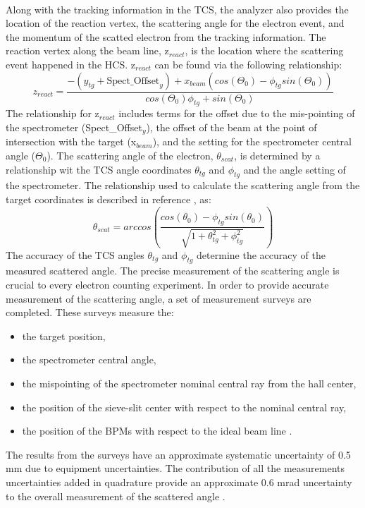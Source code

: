 \paragraph{}Along with the tracking information in the TCS, the analyzer also provides the location of the reaction vertex, the scattering angle for the electron event, and the momentum of the scatted electron from the tracking information. The reaction vertex along the beam line, z$_{react}$, is the location where the scattering event happened in the HCS. z$_{react}$ can be found via the following relationship:
\begin{equation}
z_{react} = \frac{-(y_{tg} + \text{Spect\_Offset}_y) + x_{beam}(cos(\Theta_0) - \phi_{tg}sin(\Theta_0))} {cos(\Theta_0)\phi_{tg} + sin(\Theta_0)}
\end{equation}
The relationship for z$_{react}$ includes terms for the offset due to the mis-pointing of the spectrometer (Spect\_Offset$_y$), the offset of the beam at the point of intersection with the target (x$_{beam}$), and the setting for the spectrometer central angle ($\Theta_0$). The scattering angle of the electron, $\theta_{scat}$, is determined by a relationship wit the TCS angle coordinates $\theta_{tg}$ and $\phi_{tg}$ and the angle setting of the spectrometer. The relationship used to calculate the scattering angle from the target coordinates is described in reference \cite{HallA}, as:
\begin{equation}
\theta_{scat} = arccos \left( \frac{cos(\theta_{0})- \phi_{tg}sin(\theta_{0})} {\sqrt{1 + \theta_{tg}^2 + \phi_{tg}^2}} \right) \label{scatangle}
\end{equation}
The accuracy of the TCS angles $\theta_{tg}$ and $\phi_{tg}$ determine the accuracy of the measured scattered angle. The precise measurement of the scattering angle is crucial to every electron counting experiment. In order to provide accurate measurement of the scattering angle, a set of measurement surveys are completed. These surveys measure the:
\begin{itemize}
	\item the target position,
	\item the spectrometer central angle,
	\item the mispointing of the spectrometer nominal central ray from the hall center,
	\item the position of the sieve-slit center with respect to the nominal central ray,
	\item the position of the BPMs with respect to the ideal beam line \cite{HallA}.
\end{itemize} 
The results from the surveys have an approximate systematic uncertainty of 0.5 mm due to equipment uncertainties. The contribution of all the measurements uncertainties added in quadrature provide an approximate 0.6 mrad uncertainty to the overall measurement of the scattered angle \cite{HallA}. 
